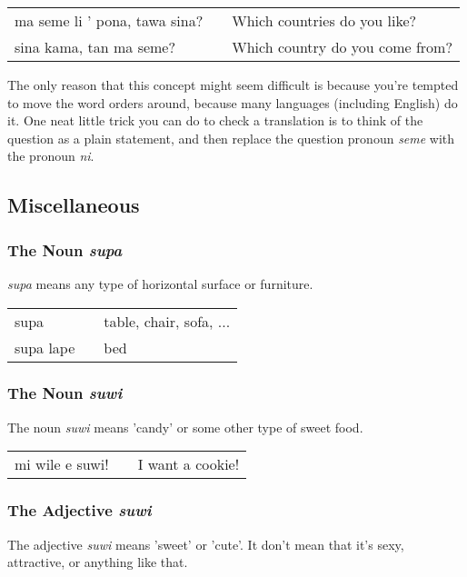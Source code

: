 \begin{supertabular}{p{5,5cm}|ll}
    ma seme li ' pona, tawa sina? &  & Which countries do you like?    \\
    sina kama, tan ma seme?       &  & Which country do you come from? \\
\end{supertabular}

The only reason that this concept might seem difficult is because you're tempted to move the word orders around, because many languages (including English) do it.
One neat little trick you can do to check a translation is to think of the question as a plain statement, and then replace the question pronoun \textit{seme} with the pronoun \textit{ni}.

\newpage

\subsection*{Miscellaneous}
\subsubsection*{The Noun \textit{supa}}
\textit{supa} means any type of horizontal surface or furniture.

\begin{supertabular}{p{5,5cm}|ll}
    supa      &  & table, chair, sofa, ... \\
    supa lape &  & bed                     \\
\end{supertabular}

\subsubsection*{The Noun \textit{suwi}}
The noun \textit{suwi} means  'candy' or some other type of sweet food.

\begin{supertabular}{p{5,5cm}|ll}
    mi wile e suwi! &  & I want a cookie! \\
\end{supertabular}

\subsubsection*{The Adjective \textit{suwi}}
The adjective \textit{suwi} means 'sweet' or 'cute'.
It don't mean that it's sexy, attractive, or anything like that.

